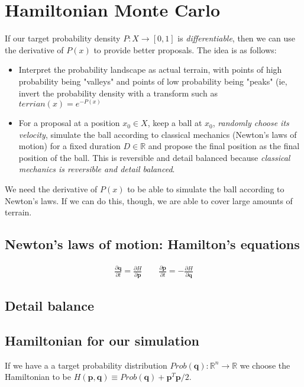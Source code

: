 \documentclass[titlepage]{article}
\newcommand{\R}{\mathbb{R}}
\newcommand{\p}{\mathbf{p}}
\newcommand{\q}{\mathbf{q}}
\begin{document}
\section{Hamiltonian Monte Carlo}
If our target probability density $P: X \rightarrow [0, 1]$ is \emph{differentiable},
then we can use the derivative of $P(x)$ to provide better proposals. The idea
is as follows:

\begin{itemize}
    \item Interpret the probability landscape as actual terrain, with
        points of high probability being "valleys" and points of low probability
        being "peaks" (ie, invert the probability density with a transform
        such as $terrian(x) = e^{-P(x)}$
    \item For a proposal at a position $x_0 \in X$, keep a ball at $x_0$,
        \emph{randomly choose its velocity}, simulate the ball according to 
        classical mechanics (Newton's laws of motion) for a fixed duration $D \in \R$
        and propose the final position as the final position of the ball. This
        is reversible and detail balanced because 
        \emph{classical mechanics is reversible and detail balanced}.
\end{itemize}
We need the derivative of $P(x)$ to be able to simulate the ball according
to Newton's laws. If we can do this, though, we are able to cover large
amounts of terrain.


\subsection{Newton's laws of motion: Hamilton's equations}

\begin{align*}
    \frac{\partial \q}{\partial t} = \frac{\partial H}{\partial \p} \qquad
    \frac{\partial \p}{\partial t} = - \frac{\partial H}{\partial \q}
\end{align*}

\subsection{Detail balance}



\subsection{Hamiltonian for our simulation}
If we have a a target probability distribution $Prob(\q): \R^n \rightarrow \R$
we choose the Hamiltonian to be $H(\p, \q) \equiv Prob(\q) + \p^T \p/2$.
\end{document}
